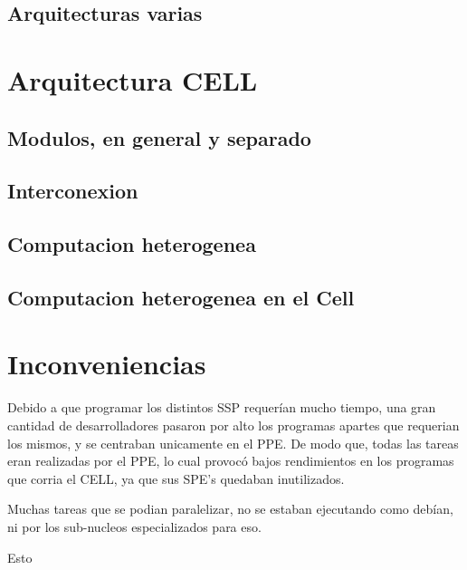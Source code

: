 \documentclass[11pt,compsoc]{IEEEtran}
\begin{document}
	\subsection{Arquitecturas varias}
	\noindent 
	
	
	
	
	
	\section{Arquitectura CELL}	%
	\noindent 
	
	\subsection{Modulos, en general y separado} 
	\noindent 
	
	\subsection{Interconexion} 
	\noindent 
	
	\subsection{Computacion heterogenea }
	\noindent 
	
	\subsection{Computacion heterogenea en el Cell }%
	\noindent 
	
	
	
	
	\section{Inconveniencias}
	\noindent Debido a que programar los distintos SSP requerían mucho tiempo, una gran cantidad  de desarrolladores pasaron por alto los programas apartes que requerian los mismos, y se centraban unicamente en el PPE. De modo que, todas las tareas eran realizadas por el PPE, lo cual provocó bajos rendimientos en los programas que corria el CELL, ya que sus SPE's quedaban inutilizados.
	
	Muchas tareas que se podian paralelizar, no se estaban ejecutando como debían, ni por los sub-nucleos especializados para eso. 
	
	Esto 
	
	
	
	
	
\end{document}
